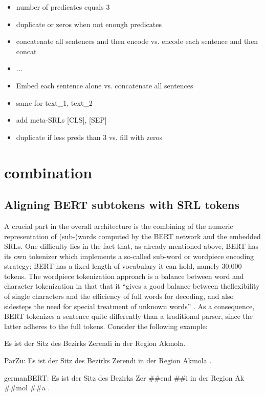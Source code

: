 \begin{itemize}
  \item number of predicates equals 3
  \item duplicate or zeros when not enough predicates
  \item concatenate all sentences and then encode vs. encode each sentence and then concat
  \item ...
\end{itemize}

\begin{itemize}
	\item Embed each sentence alone vs. concatenate all sentences
	\item same for text\_1, text\_2
	\item add meta-SRLs [CLS], [SEP]
	\item duplicate if less preds than 3 vs. fill with zeros
\end{itemize}

\section{combination}

\subsection{Aligning BERT subtokens with SRL tokens}

A crucial part in the overall architecture is the combining of the numeric representation
of (sub-)words computed by the BERT network and the embedded SRLs. One difficulty lies in
the fact that, as already mentioned above, BERT has its own tokenizer which implements
a so-called sub-word or wordpiece \cite{wu2016google} encoding strategy: BERT has a
fixed length of vocabulary it can hold, namely 30,000 tokens. The wordpiece tokenization
approach is a balance between word and character tokenization in that that it ``gives
a good balance between theflexibility of single characters and the efficiency of full
words for decoding, and also sidesteps the need for special treatment of unknown words''
\citep[p.~2]{wu2016google}. As a consequence, BERT tokenizes a sentence quite differently
than a traditional parser, since the latter adheres to the full tokens. Consider the
following example:

\begin{examples}
	\label{ex:tokenization-diff}
	\item Es ist der Sitz des Bezirks Zerendi in der Region Akmola.
	\item ParZu: Es ist der Sitz des Bezirks Zerendi in der Region Akmola .
	\item germanBERT: Es ist der Sitz des Bezirks Zer \#\#end \#\#i in der Region Ak \#\#mol \#\#a .
\end{examples}


